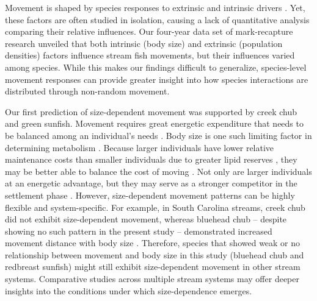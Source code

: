 \documentclass[11pt, class=article, crop=false]{standalone}
\begin{document}
Movement is shaped by species responses to extrinsic and intrinsic drivers \citep{clobertDispersalEcologyEvolution2012}. Yet, these factors are often studied in isolation, causing a lack of quantitative analysis comparing their relative influences. Our four-year data set of mark-recapture research unveiled that both intrinsic (body size) and extrinsic (population densities) factors influence stream fish movements, but their influences varied among species. While this makes our findings difficult to generalize, species-level movement responses can provide greater insight into how species interactions are distributed through non-random movement. 

Our first prediction of size-dependent movement was supported by creek chub and green sunfish. Movement requires great energetic expenditure that needs to be balanced among an individual’s needs \citep{boisclairImportanceActivityBioenergetics1989, joblingBioenergeticsFeedIntake1993, cookeMovementEcologyFishes2022}. Body size is one such limiting factor in determining metabolism \citep{beamish2SwimmingCapacity1978, rubio-graciaSizerelatedEffectsInfluence2020}. Because larger individuals have lower relative maintenance costs than smaller individuals due to greater lipid reserves \citep{brownSizeMattersTest2004, krauseRefugeUseFish1998, kannoBodyConditionMetrics2023}, they may be better able to balance the cost of moving \citep{schlagelMovementmediatedCommunityAssembly2020}. Not only are larger individuals at an energetic advantage, but they may serve as a stronger competitor in the settlement phase \citep{rasmussenIndividualMovementStream2017}. 
However, size-dependent movement patterns can be highly flexible and system-specific. For example, in South Carolina streams, creek chub did not exhibit size-dependent movement, whereas bluehead chub -- despite showing no such pattern in the present study -- demonstrated increased movement distance with body size \citep{teruiNonrandomDispersalSympatric2021}. Therefore, species that showed weak or no relationship between movement and body size in this study (bluehead chub and redbreast sunfish) might still exhibit size-dependent movement in other stream systems.
Comparative studies across multiple stream systems may offer deeper insights into the conditions under which size-dependence emerges.
\end{document}
